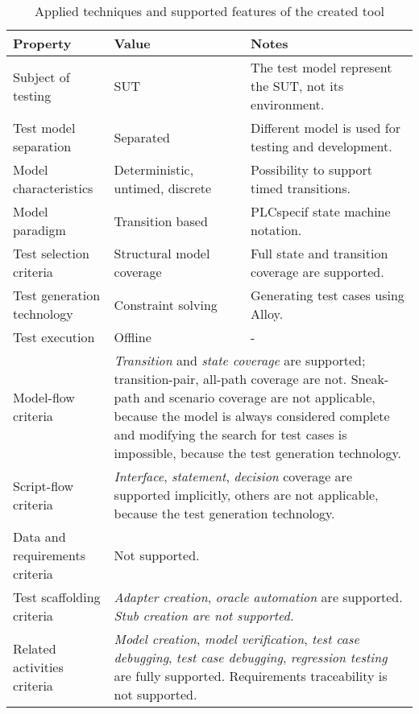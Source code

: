 \begin{table}[htb]
\begin{center}
\begin{tabular}{|p{4cm}|p{3cm}|p{8cm}|}
\hline
	\textbf{Property} & \textbf{Value} & \textbf{Notes} \\\hline
	Subject of testing & SUT & The test model represent the SUT, not its environment. \\\hline
	Test model separation & Separated & Different model is used for testing and development.\\\hline
	Model characteristics & Deterministic, untimed, discrete & Possibility to support timed transitions. \\\hline
	Model paradigm & Transition based & PLCspecif state machine notation.\\\hline
	Test selection criteria & Structural model coverage & Full state and transition coverage are supported.\\\hline
	Test generation technology & Constraint solving & Generating test cases using Alloy. \\\hline
	Test execution & Offline & - \\\hline
	Model-flow criteria & \multicolumn{2}{p{11cm}|}{\textit{Transition} and \textit{state coverage} are supported; transition-pair, all-path coverage are not. Sneak-path and scenario coverage are not applicable, because the model is always considered complete and modifying the search for test cases is impossible, because the test generation technology.} \\\hline
	Script-flow criteria & \multicolumn{2}{p{11cm}|}{\textit{Interface}, \textit{statement}, \textit{decision} coverage are supported implicitly, others are not applicable, because the test generation technology.} \\\hline
	Data and requirements criteria & \multicolumn{2}{p{11cm}|}{Not supported.} \\\hline
	Test scaffolding criteria & \multicolumn{2}{p{11cm}|}{\textit{Adapter creation}, \textit{oracle automation} are supported. \textit{Stub creation are not supported.}} \\\hline
	Related activities criteria & \multicolumn{2}{p{11cm}|}{\textit{Model creation}, \textit{model verification}, \textit{test case debugging}, \textit{test case debugging}, \textit{regression testing} are fully supported. Requirements traceability is not supported.} \\
\hline
\end{tabular}
\end{center}
\caption{\label{tab:toolevaluation} Applied techniques and supported features of the created tool}
\end{table}

